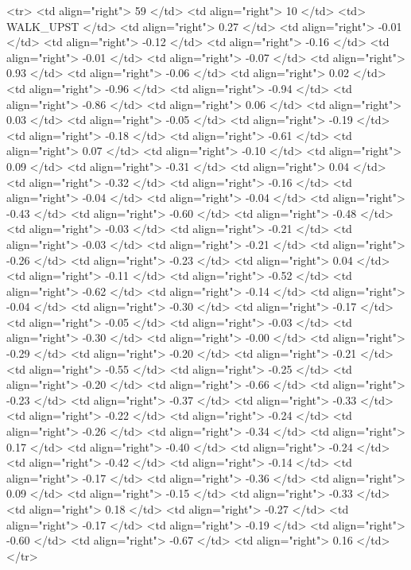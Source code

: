   <tr> <td align="right"> 59 </td> <td align="right">  10 </td> <td> WALK_UPST </td> <td align="right"> 0.27 </td> <td align="right"> -0.01 </td> <td align="right"> -0.12 </td> <td align="right"> -0.16 </td> <td align="right"> -0.01 </td> <td align="right"> -0.07 </td> <td align="right"> 0.93 </td> <td align="right"> -0.06 </td> <td align="right"> 0.02 </td> <td align="right"> -0.96 </td> <td align="right"> -0.94 </td> <td align="right"> -0.86 </td> <td align="right"> 0.06 </td> <td align="right"> 0.03 </td> <td align="right"> -0.05 </td> <td align="right"> -0.19 </td> <td align="right"> -0.18 </td> <td align="right"> -0.61 </td> <td align="right"> 0.07 </td> <td align="right"> -0.10 </td> <td align="right"> 0.09 </td> <td align="right"> -0.31 </td> <td align="right"> 0.04 </td> <td align="right"> -0.32 </td> <td align="right"> -0.16 </td> <td align="right"> -0.04 </td> <td align="right"> -0.04 </td> <td align="right"> -0.43 </td> <td align="right"> -0.60 </td> <td align="right"> -0.48 </td> <td align="right"> -0.03 </td> <td align="right"> -0.21 </td> <td align="right"> -0.03 </td> <td align="right"> -0.21 </td> <td align="right"> -0.26 </td> <td align="right"> -0.23 </td> <td align="right"> 0.04 </td> <td align="right"> -0.11 </td> <td align="right"> -0.52 </td> <td align="right"> -0.62 </td> <td align="right"> -0.14 </td> <td align="right"> -0.04 </td> <td align="right"> -0.30 </td> <td align="right"> -0.17 </td> <td align="right"> -0.05 </td> <td align="right"> -0.03 </td> <td align="right"> -0.30 </td> <td align="right"> -0.00 </td> <td align="right"> -0.29 </td> <td align="right"> -0.20 </td> <td align="right"> -0.21 </td> <td align="right"> -0.55 </td> <td align="right"> -0.25 </td> <td align="right"> -0.20 </td> <td align="right"> -0.66 </td> <td align="right"> -0.23 </td> <td align="right"> -0.37 </td> <td align="right"> -0.33 </td> <td align="right"> -0.22 </td> <td align="right"> -0.24 </td> <td align="right"> -0.26 </td> <td align="right"> -0.34 </td> <td align="right"> 0.17 </td> <td align="right"> -0.40 </td> <td align="right"> -0.24 </td> <td align="right"> -0.42 </td> <td align="right"> -0.14 </td> <td align="right"> -0.17 </td> <td align="right"> -0.36 </td> <td align="right"> 0.09 </td> <td align="right"> -0.15 </td> <td align="right"> -0.33 </td> <td align="right"> 0.18 </td> <td align="right"> -0.27 </td> <td align="right"> -0.17 </td> <td align="right"> -0.19 </td> <td align="right"> -0.60 </td> <td align="right"> -0.67 </td> <td align="right"> 0.16 </td> </tr>
